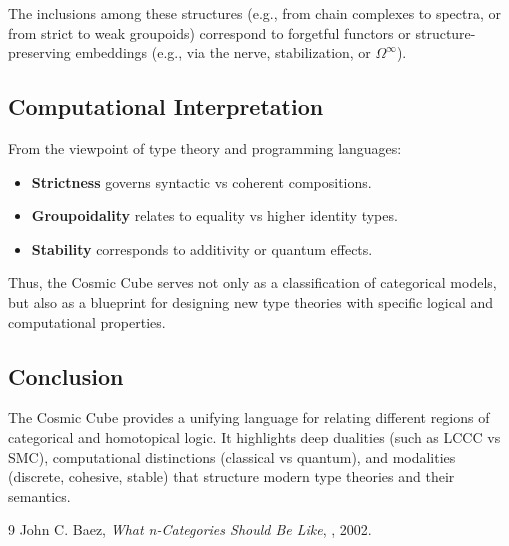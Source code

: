 \documentclass{article}
\begin{document}
The inclusions among these structures (e.g., from chain
complexes to spectra, or from strict to weak groupoids)
correspond to forgetful functors or structure-preserving
embeddings (e.g., via the nerve, stabilization, or $\Omega^\infty$).

\subsection{Computational Interpretation}

From the viewpoint of type theory and programming languages:

\begin{itemize}
\item \textbf{Strictness} governs syntactic vs coherent compositions.
\item \textbf{Groupoidality} relates to equality vs higher identity types.
\item \textbf{Stability} corresponds to additivity or quantum effects.
\end{itemize}

Thus, the Cosmic Cube serves not only as a classification of categorical models, but also as a blueprint for designing new type theories with specific logical and computational properties.

\subsection{Conclusion}
The Cosmic Cube provides a unifying language for relating different regions
of categorical and homotopical logic. It highlights deep dualities (such as
LCCC vs SMC), computational distinctions (classical vs quantum),
and modalities (discrete, cohesive, stable) that structure modern
type theories and their semantics.

\begin{thebibliography}{9}
 John C. Baez, \emph{What n-Categories Should Be Like}, , 2002.
\end{thebibliography}
\end{document}
